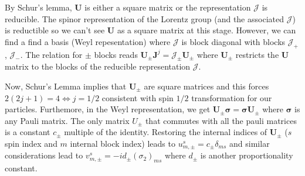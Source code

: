 \documentclass[10pt, a4paper]{article}
\begin{document}
By Schur's lemma, $\mathbf{U}$ is either a square matrix or the representation $\mathcal{J}$ is reducible. The spinor representation of the Lorentz group (and the associated $\mathcal{J}$) is reductible so we can't see $\mathbf{U}$ as a square matrix at this stage. However, we can find a find a basis (Weyl repesentation) where $\mathcal{J}$ is block diagonal with blocks $\mathcal{J}_+$, $\mathcal{J}_-$. The relation for $\pm$ blocks reads 
$
  \mathbf{U}_{\pm}\mathbf{J}^{j} = \mathcal{J}_\pm \mathbf{U}_{\pm}
$
where $\mathbf{U}_{\pm}$ restricts the $\mathbf{U}$ matrix to the blocks of the reducible representation $\mathcal{J}$. 

Now, Schur's Lemma implies that $\mathbf{U}_{\pm}$ are square matrices and this forces $2(2j+1) = 4 \iff j = 1/2$ consistent with spin $1/2$ transformation for our particles. Furthemore, in the Weyl representation, we get
$
  \mathbf{U}_{\pm}\mathbf{\sigma} = \mathbf{\sigma} \mathbf{U}_{\pm}
$
where $\mathbf{\sigma}$ is any Pauli matrix. The only matrix $U_{\pm}$ that commutes with all the pauli matrices is a constant $c_\pm$ multiple of the identity. Restoring the internal indices of $\mathbf{U}_{\pm}$ ($s$ spin index and $m$ internal block index) leads to $u_{m, \pm}^{s} = c_\pm \delta_{ms}$ and similar considerations lead to $v_{m, \pm}^{s} = -id_\pm (\sigma_2)_{ms}$ where $d_\pm$ is another proportionality constant. 
\end{document}
